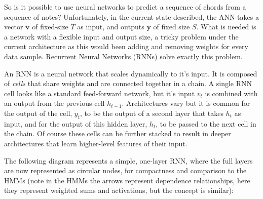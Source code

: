 \documentclass[bsc,singlespacing,logo, parskip, deptreport]{infthesis}
\begin{document}
So is it possible to use neural networks to predict a sequence of chords from a sequence of notes? Unfortunately, in the current state described, the ANN takes a vector $\bm{v}$ of fixed-size $T$ as input, and outputs $\bm{y}$ of fixed size $S$. What is needed is a network with a flexible input and output size, a tricky problem under the current architecture as this would been adding and removing weights for every data sample. Recurrent Neural Networks (RNNs) solve exactly this problem.

An RNN is a neural network that scales dynamically to it's input. It is composed of {\em cells} that share weights and are connected together in a chain. A single RNN cell looks like a standard feed-forward network, but it's input $v_t$ is combined with an output from the previous cell $h_{t-1}$. Architectures vary but it is common for the output of the cell, $y_t$, to be the output of a second layer that takes $h_t$ as input, and for the output of this hidden layer, $h_t$, to be passed to the next cell in the chain. Of course these cells can be further stacked to result in deeper architectures that learn higher-level features of their input.

The following diagram represents a simple, one-layer RNN, where the full layers are now represented as circular nodes, for compactness and comparison to the HMMs (note in the HMMs the arrows represent dependence relationships, here they represent weighted sums and activations, but the concept is similar):

\begin{center}
\end{center}
\end{document}
